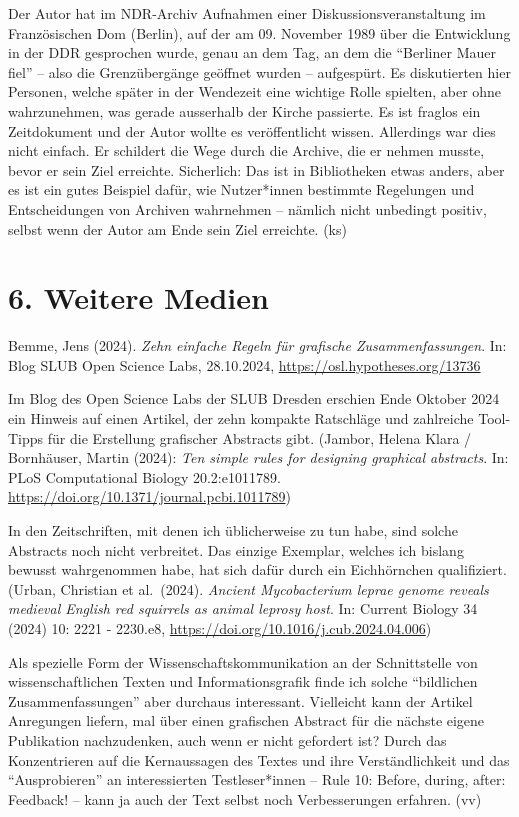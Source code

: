 \documentclass[a4paper,
fontsize=11pt,
oneside,
numbers=noperiodatend,
parskip=half-,
bibliography=totoc,
final
]{scrartcl}
\begin{document}
Der Autor hat im NDR-Archiv Aufnahmen einer Diskussionsveranstaltung im
Französischen Dom (Berlin), auf der am 09. November 1989 über die
Entwicklung in der DDR gesprochen wurde, genau an dem Tag, an dem die
\enquote{Berliner Mauer fiel} -- also die Grenzübergänge geöffnet wurden
-- aufgespürt. Es diskutierten hier Personen, welche später in der
Wendezeit eine wichtige Rolle spielten, aber ohne wahrzunehmen, was
gerade ausserhalb der Kirche passierte. Es ist fraglos ein Zeitdokument
und der Autor wollte es veröffentlicht wissen. Allerdings war dies nicht
einfach. Er schildert die Wege durch die Archive, die er nehmen musste,
bevor er sein Ziel erreichte. Sicherlich: Das ist in Bibliotheken etwas
anders, aber es ist ein gutes Beispiel dafür, wie Nutzer*innen bestimmte
Regelungen und Entscheidungen von Archiven wahrnehmen -- nämlich nicht
unbedingt positiv, selbst wenn der Autor am Ende sein Ziel erreichte.
(ks)

\hypertarget{weitere-medien}{%
\section{6. Weitere Medien}\label{weitere-medien}}

Bemme, Jens (2024). \emph{Zehn einfache Regeln für grafische
Zusammenfassungen}. In: Blog SLUB Open Science Labs, 28.10.2024,
\url{https://osl.hypotheses.org/13736}

Im Blog des Open Science Labs der SLUB Dresden erschien Ende Oktober
2024 ein Hinweis auf einen Artikel, der zehn kompakte Ratschläge und
zahlreiche Tool-Tipps für die Erstellung grafischer Abstracts gibt.
(Jambor, Helena Klara / Bornhäuser, Martin (2024): \emph{Ten simple
rules for designing graphical abstracts}. In: PLoS Computational Biology
20.2:e1011789. \url{https://doi.org/10.1371/journal.pcbi.1011789})

In den Zeitschriften, mit denen ich üblicherweise zu tun habe, sind
solche Abstracts noch nicht verbreitet. Das einzige Exemplar, welches
ich bislang bewusst wahrgenommen habe, hat sich dafür durch ein
Eichhörnchen qualifiziert. (Urban, Christian et al.~(2024).
\emph{Ancient Mycobacterium leprae genome reveals medieval English red
squirrels as animal leprosy host}. In: Current Biology 34 (2024) 10:
2221 - 2230.e8, \url{https://doi.org/10.1016/j.cub.2024.04.006})

Als spezielle Form der Wissenschaftskommunikation an der Schnittstelle
von wissenschaftlichen Texten und Informationsgrafik finde ich solche
\enquote{bildlichen Zusammenfassungen} aber durchaus interessant.
Vielleicht kann der Artikel Anregungen liefern, mal über einen
grafischen Abstract für die nächste eigene Publikation nachzudenken,
auch wenn er nicht gefordert ist? Durch das Konzentrieren auf die
Kernaussagen des Textes und ihre Verständlichkeit und das
\enquote{Ausprobieren} an interessierten Testleser*innen -- Rule 10:
Before, during, after: Feedback! -- kann ja auch der Text selbst noch
Verbesserungen erfahren. (vv)

\end{document}
